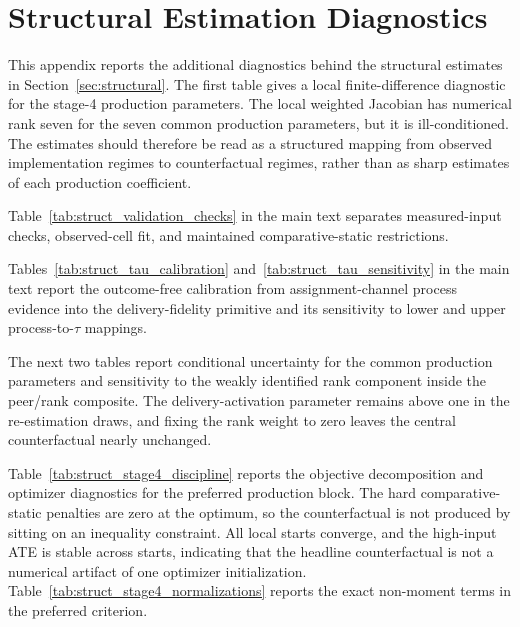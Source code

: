 \documentclass[11pt]{article}
\begin{document}
\section{Structural Estimation Diagnostics}
\label{app:struct_diagnostics}

This appendix reports the additional diagnostics behind the structural estimates in Section~\ref{sec:structural}. The first table gives a local finite-difference diagnostic for the stage-4 production parameters. The local weighted Jacobian has numerical rank seven for the seven common production parameters, but it is ill-conditioned. The estimates should therefore be read as a structured mapping from observed implementation regimes to counterfactual regimes, rather than as sharp estimates of each production coefficient.

Table~\ref{tab:struct_validation_checks} in the main text separates measured-input checks, observed-cell fit, and maintained comparative-static restrictions.

Tables~\ref{tab:struct_tau_calibration} and~\ref{tab:struct_tau_sensitivity} in the main text report the outcome-free calibration from assignment-channel process evidence into the delivery-fidelity primitive and its sensitivity to lower and upper process-to-$\tau$ mappings.



The next two tables report conditional uncertainty for the common production parameters and sensitivity to the weakly identified rank component inside the peer/rank composite. The delivery-activation parameter remains above one in the re-estimation draws, and fixing the rank weight to zero leaves the central counterfactual nearly unchanged.





Table~\ref{tab:struct_stage4_discipline} reports the objective decomposition and optimizer diagnostics for the preferred production block. The hard comparative-static penalties are zero at the optimum, so the counterfactual is not produced by sitting on an inequality constraint. All local starts converge, and the high-input ATE is stable across starts, indicating that the headline counterfactual is not a numerical artifact of one optimizer initialization. Table~\ref{tab:struct_stage4_normalizations} reports the exact non-moment terms in the preferred criterion.
\end{document}
